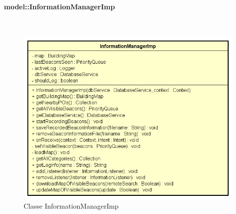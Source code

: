 \documentclass[../DefinizioneDiProdotto.tex]{subfiles}
\begin{document}
\paragraph{model::InformationManagerImp}
\
\begin{figure}[H]
	\centering
	\includegraphics[width=\maxwidth]{img/InformationManagerImp.png}
	\caption{Classe InformationManagerImp}\label{fig:model::InformationManagerImp} 
\end{figure}
\end{document}
